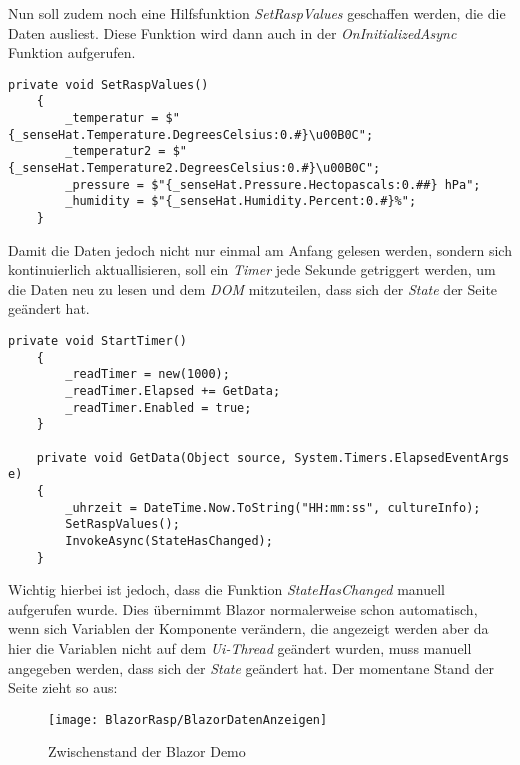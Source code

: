 Nun soll zudem noch eine Hilfsfunktion \emph{SetRaspValues} geschaffen werden, die die Daten
ausliest. Diese Funktion wird dann auch in der \emph{OnInitializedAsync} Funktion aufgerufen.

\begin{lstlisting}[language={[Sharp]C}, caption=Funktion: SetRaspValues,
    label=lst:SetRaspValues]
    private void SetRaspValues()
    {
        _temperatur = $"{_senseHat.Temperature.DegreesCelsius:0.#}\u00B0C";
        _temperatur2 = $"{_senseHat.Temperature2.DegreesCelsius:0.#}\u00B0C";
        _pressure = $"{_senseHat.Pressure.Hectopascals:0.##} hPa";
        _humidity = $"{_senseHat.Humidity.Percent:0.#}%";
    }
\end{lstlisting}

Damit die Daten jedoch nicht nur einmal am Anfang gelesen werden, sondern sich kontinuierlich
aktuallisieren, soll ein \emph{Timer} jede Sekunde getriggert werden, um die Daten neu zu lesen
und dem \emph{DOM} mitzuteilen, dass sich der \emph{State} der Seite geändert hat.

\begin{lstlisting}[language={[Sharp]C}, caption=Timer: ReadTimer,
    label=lst:ReadTimer]
    private void StartTimer()
    {
        _readTimer = new(1000);
        _readTimer.Elapsed += GetData;
        _readTimer.Enabled = true;
    }

    private void GetData(Object source, System.Timers.ElapsedEventArgs e)
    {
        _uhrzeit = DateTime.Now.ToString("HH:mm:ss", cultureInfo);
        SetRaspValues();
        InvokeAsync(StateHasChanged);
    }
\end{lstlisting}

Wichtig hierbei ist jedoch, dass die Funktion \emph{StateHasChanged} manuell aufgerufen
wurde. Dies übernimmt Blazor normalerweise schon automatisch, wenn sich Variablen der Komponente
verändern, die angezeigt werden aber da hier die Variablen nicht auf dem \emph{Ui-Thread} geändert
wurden, muss manuell angegeben werden, dass sich der \emph{State} geändert hat.
\newline
\newline
Der momentane Stand der Seite zieht so aus:

\begin{figure}[h]
    \centering
    \texttt{[image: BlazorRasp/BlazorDatenAnzeigen]}
    \caption[Zwischenstand der Blazor Demo]{Zwischenstand der Blazor Demo}
    \label{img:BlazorDatenAnzeigen}
\end{figure}